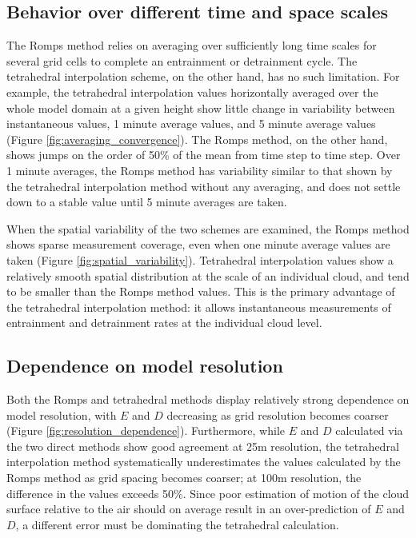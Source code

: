 \documentclass[12pt]{article}
\begin{document}
\subsection{Behavior over different time and space scales}

The Romps method relies on averaging over sufficiently long time scales for 
several grid cells to complete an entrainment or detrainment cycle.  The 
tetrahedral interpolation scheme, on the other hand, has no such limitation.  
For example, the tetrahedral interpolation values horizontally averaged over 
the whole model domain at a given height show little change in variability 
between instantaneous values, 1 minute average values, and 5 minute average 
values (Figure \ref{fig:averaging_convergence}).  The Romps method, on the 
other hand, shows jumps on the order of 50\% of the mean from time step to 
time step.  Over 1 minute averages, the Romps method has variability 
similar to that shown by the tetrahedral interpolation method without any 
averaging, and does not settle down to a stable value until 5 minute averages 
are taken.

When the spatial variability of the two schemes are examined, the Romps 
method shows sparse measurement coverage, even when one minute average values 
are taken (Figure \ref{fig:spatial_variability}).  Tetrahedral interpolation 
values show a relatively smooth spatial distribution at the scale of an 
individual cloud, and tend to be smaller than the Romps method values.  
This is the primary advantage of the tetrahedral interpolation method: it 
allows instantaneous measurements of entrainment and detrainment rates at the 
individual cloud level.

\subsection{Dependence on model resolution}

Both the Romps and tetrahedral methods display relatively strong dependence 
on model resolution, with $E$ and $D$ decreasing as grid resolution becomes 
coarser (Figure \ref{fig:resolution_dependence}).  Furthermore, while $E$ 
and $D$ calculated via the two direct methods show good agreement at 25m 
resolution, the tetrahedral interpolation method systematically 
underestimates the values calculated by the Romps method as grid spacing 
becomes coarser; at 100m resolution, the difference in the values exceeds 
50\%.  Since poor estimation of motion of the cloud surface relative to the 
air should on average result in an over-prediction of $E$ and $D$, a 
different error must be dominating the tetrahedral calculation.
\end{document}
